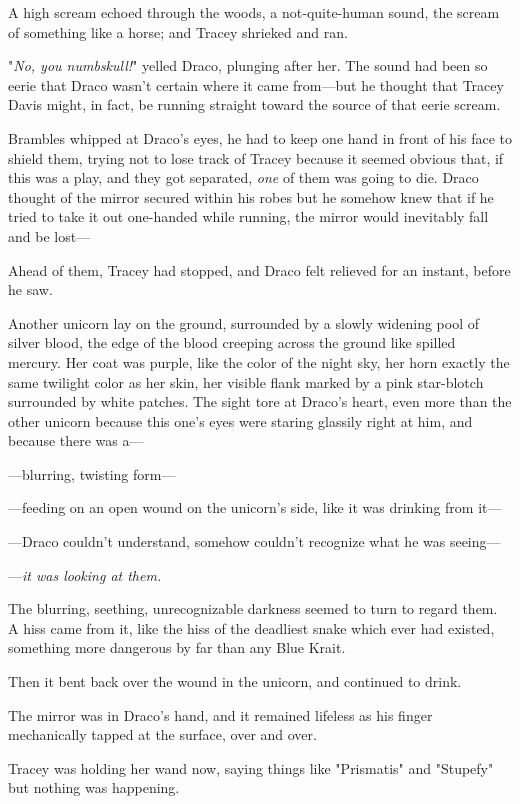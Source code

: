 A high scream echoed through the woods, a not-quite-human sound, the scream of
something like a horse; and Tracey shrieked and ran.

"\emph{No, you numbskull!}" yelled Draco, plunging after her. The sound had
been so eerie that Draco wasn't certain where it came from---but he thought
that Tracey Davis might, in fact, be running straight toward the source of that
eerie scream.

Brambles whipped at Draco's eyes, he had to keep one hand in front of his face
to shield them, trying not to lose track of Tracey because it seemed obvious
that, if this was a play, and they got separated, \emph{one} of them was going
to die. Draco thought of the mirror secured within his robes but he somehow
knew that if he tried to take it out one-handed while running, the mirror would
inevitably fall and be lost---

Ahead of them, Tracey had stopped, and Draco felt relieved for an instant,
before he saw.

Another unicorn lay on the ground, surrounded by a slowly widening pool of
silver blood, the edge of the blood creeping across the ground like spilled
mercury. Her coat was purple, like the color of the night sky, her horn exactly
the same twilight color as her skin, her visible flank marked by a pink
star-blotch surrounded by white patches. The sight tore at Draco's heart, even
more than the other unicorn because this one's eyes were staring glassily right
at him, and because there was a---

---blurring, twisting form---

---feeding on an open wound on the unicorn's side, like it was drinking from
it---

---Draco couldn't understand, somehow couldn't recognize what he was seeing---

---\emph{it was looking at them.}

The blurring, seething, unrecognizable darkness seemed to turn to regard them.
A hiss came from it, like the hiss of the deadliest snake which ever had
existed, something more dangerous by far than any Blue Krait.

Then it bent back over the wound in the unicorn, and continued to drink.

The mirror was in Draco's hand, and it remained lifeless as his finger
mechanically tapped at the surface, over and over.

Tracey was holding her wand now, saying things like "Prismatis" and "Stupefy"
but nothing was happening.

